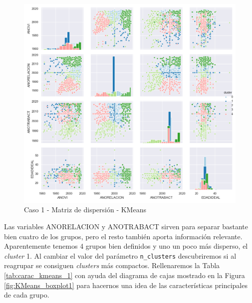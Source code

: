 \documentclass[a4paper, 20pt]{article}
\begin{document}
\begin{figure}[H]
    \centering
    \includegraphics[width=1\textwidth]{./caso1/KMeans_scattermatrix}
    \caption{Caso 1 - Matriz de dispersión - KMeans}
    \label{fig:KMeans_scatter1}
\end{figure}

Las variables ANORELACION y ANOTRABACT sirven para separar bastante bien cuatro de los grupos, pero el resto también aporta información relevante. Aparentemente tenemos 4 grupos bien definidos y uno un poco más disperso, el \textit{cluster} 1. Al cambiar el valor del parámetro \texttt{n\_clusters} descubriremos si al reagrupar se consiguen \textit{clusters} más compactos. Rellenaremos la Tabla \ref{tab:carac_kmeans_1} con ayuda del diagrama de cajas mostrado en la Figura \ref{fig:KMeans_boxplot1} para hacernos una idea de las características principales de cada grupo.
\end{document}

